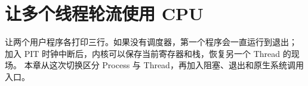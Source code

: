 \chapter{让多个线程轮流使用 CPU}

让两个用户程序各打印三行。如果没有调度器，第一个程序会一直运行到退出；
加入 PIT 时钟中断后，内核可以保存当前寄存器和栈，恢复另一个 Thread 的现场。
本章从这次切换区分 Process 与 Thread，再加入阻塞、退出和原生系统调用入口。





